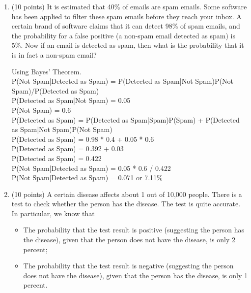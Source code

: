 \documentclass{article}%
\begin{document}
\begin{enumerate}
    K Harry knows the right answer \\
    C harry answers the question correctly

    $P(K) = x\\
    P(not K) = 1 - x\\
    P(C|not K) = 1/y\\
    P(C|K) = 1\\
    P(K|C) = P(K)P(C|K)/P(C)\\
    P(C) = P(K)P(C|K) + P(not K)P(C|not K)\\
    P(C) = (1 * x) + (1/y)(1-x)\\
    P(C) = x + (1/y)(1-x)\\
    P(K|C) = \frac{1 * x}{x + (1/y)(1-x)}\\
    P(K|C) = \frac{xy}{xy + 1 - x}$

    \item (10 points) It is estimated that 40\% of emails are spam emails. Some software has been applied to filter these spam emails before they reach your inbox. A certain brand of software claims that it can detect 98\% of spam emails, and the probability for a false positive (a non-spam email detected as spam) is 5\%. Now if an email is detected as spam, then what is the probability that it is in fact a non-spam email?

    Using Bayes' Theorem. \\
    P(Not Spam|Detected as Spam) = P(Detected as Spam|Not Spam)P(Not Spam)/P(Detected as Spam)\\
    P(Detected as Spam|Not Spam) = 0.05\\
    P(Not Spam) = 0.6\\
    P(Detected as Spam) = P(Detected as Spam|Spam)P(Spam) + P(Detected as Spam|Not Spam)P(Not Spam)\\
    P(Detected as Spam) = 0.98 * 0.4 + 0.05 * 0.6\\
    P(Detected as Spam) = 0.392 + 0.03\\
    P(Detected as Spam) = 0.422\\
    P(Not Spam|Detected as Spam) = 0.05 * 0.6 / 0.422\\
    P(Not Spam|Detected as Spam) = 0.071 or 7.11\%
 
    \item (10 points) A  certain  disease  affects  about 1 out  of 10,000  people.  There  is  a  test  to  check whether the person has the disease. The test is quite accurate. In particular, we know that

    \begin{itemize}
        \item The probability that the test result is positive  (suggesting the person has the disease), given that the person does not have the disease, is only 2 percent; 
        \item The probability that the test result is negative (suggesting the person does not have the disease), given that the person has the disease, is only 1 percent. 
    \end{itemize}


\end{enumerate}
\end{document}
